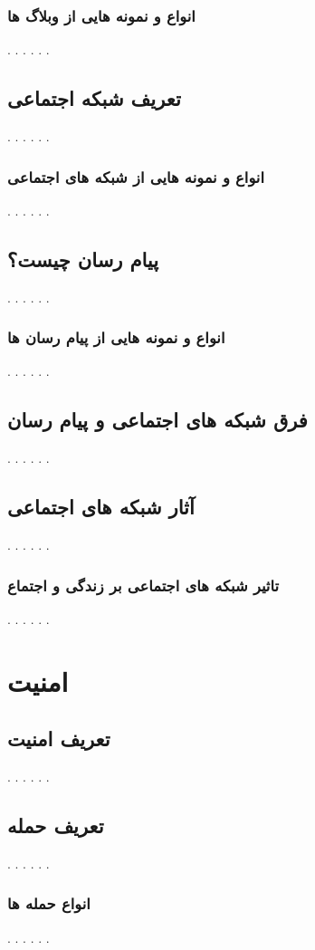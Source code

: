 \documentclass[12pt]{book}
\begin{document}
\subsection{انواع و نمونه هایی از وبلاگ ها}
. . . . . .
\section{تعریف شبکه اجتماعی}
. . . . . .
\subsection{انواع و نمونه هایی از شبکه های اجتماعی}
. . . . . .
\section{پیام رسان چیست؟}
. . . . . .
\subsection{انواع و نمونه هایی از پیام رسان ها}
. . . . . .
\section{فرق شبکه های اجتماعی و پیام رسان}
. . . . . .
\section{آثار شبکه های اجتماعی}
. . . . . .
\subsection{تاثیر شبکه های اجتماعی بر زندگی و اجتماع}
. . . . . .



\newpage
\chapter{امنیت}


\section{تعریف امنیت}
. . . . . .
\section{تعریف حمله}
. . . . . .
\subsection{انواع حمله ها}
. . . . . .
\end{document}
